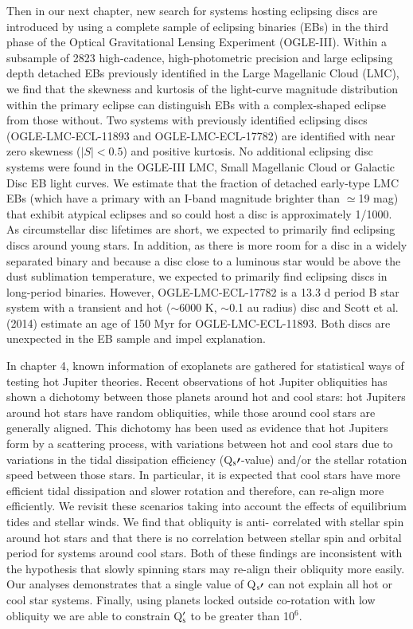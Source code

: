 \begin{englishabstract}
Then in our next chapter, new search for systems hosting eclipsing discs are introduced by using a complete 
sample of eclipsing binaries (EBs) in the third phase of the Optical Gravitational Lensing Experiment (OGLE-III). 
Within a subsample of 2823 high-cadence, high-photometric 
precision and large eclipsing depth detached EBs previously identified in the Large Magellanic Cloud (LMC), 
we find that the skewness and kurtosis of the light-curve magnitude distribution within the primary eclipse 
can distinguish EBs with a complex-shaped eclipse from those without. Two systems with previously identified 
eclipsing discs (OGLE-LMC-ECL-11893 and OGLE-LMC-ECL-17782) are identified with near zero skewness 
($|S| < 0.5$) and positive kurtosis. No additional eclipsing disc systems were found in the OGLE-III LMC, 
Small Magellanic Cloud or Galactic Disc EB light curves. We estimate that the fraction of detached early-type 
LMC EBs (which have a primary with an I-band magnitude brighter than $\simeq$19 mag) that exhibit 
atypical eclipses and so could host a disc is approximately 1/1000. As circumstellar disc lifetimes are short, 
we expected to primarily find eclipsing discs around young stars. In addition, as there is more room for a disc 
in a widely separated binary and because a disc close to a luminous star would be above the dust sublimation 
temperature, we expected to primarily find eclipsing discs in long-period binaries. However, 
OGLE-LMC-ECL-17782 is a 13.3 d period B star system with a transient and hot ($\sim$6000 K, $\sim$0.1 au 
radius) disc and Scott et al. (2014) estimate an age of 150 Myr for OGLE-LMC-ECL-11893. Both discs are 
unexpected in the EB sample and impel explanation.

In chapter 4, known information of exoplanets are gathered for statistical ways of testing hot Jupiter theories.
Recent observations of hot Jupiter obliquities has shown a dichotomy between those planets around hot and 
cool stars: hot Jupiters around hot stars have random obliquities, while those around cool stars are generally
aligned.  This dichotomy has been used as evidence that hot Jupiters form by a scattering process, with 
variations between hot and cool stars due to variations in the tidal dissipation efficiency (Q$_\mathrm{s}\prime$-value)
and/or the stellar rotation speed between those stars.  In particular, it is expected that cool stars have more 
efficient tidal dissipation and slower rotation and therefore, can re-align more efficiently.  We revisit these 
scenarios taking into account the effects of equilibrium tides and stellar winds.  We find that obliquity is anti-
correlated with stellar spin around hot stars and that there is no correlation between stellar spin and orbital 
period for systems around cool stars.  Both of these findings are inconsistent with the hypothesis that slowly 
spinning stars may re-align their obliquity more easily.  Our analyses demonstrates that a single value of Q$_
\mathrm{s}\prime$ can not explain all hot or cool star systems.  Finally, using planets locked outside co-rotation with low 
obliquity we are able to constrain Q$_\mathrm{s}^\prime$ to be greater than 10$^{6}$. 


\end{englishabstract}
